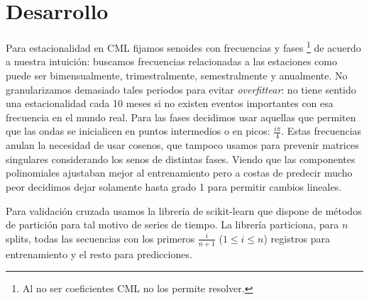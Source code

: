 \section{Desarrollo}
Para estacionalidad en CML fijamos senoides con frecuencias y fases \footnote{Al no ser coeficientes CML no los permite resolver.} de acuerdo a nuestra intuición: buscamos frecuencias relacionadas a las estaciones como puede ser bimensualmente, trimestralmente, semestralmente y anualmente.
No granularizamos demasiado tales periodos para evitar \emph{overfittear}: no tiene sentido una estacionalidad cada 10 meses si no existen eventos importantes con esa frecuencia en el mundo real.
Para las fases decidimos usar aquellas que permiten que las ondas se inicialicen en puntos intermedios o en picos: $\frac{i\pi}{4}$.
Estas frecuencias anulan la necesidad de usar cosenos, que tampoco usamos para prevenir matrices singulares considerando los senos de distintas fases.
Viendo que las componentes polinomiales ajustaban mejor al entrenamiento pero a costas de predecir mucho peor decidimos dejar solamente hasta grado 1 para permitir cambios lineales.

Para validación cruzada usamos la librería de scikit-learn que dispone de métodos de partición para tal motivo de series de tiempo. La librería particiona, para $n$ splits, todas las secuencias con los primeros $\frac{i}{n+1}$ ($1\leq i\leq n$) registros para entrenamiento y el resto para predicciones.
